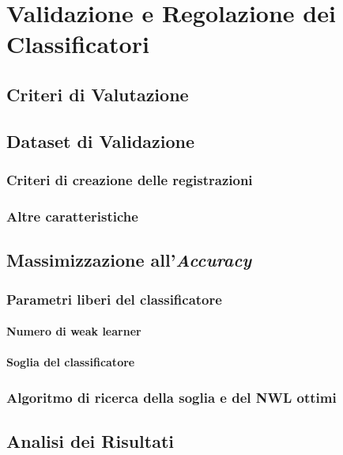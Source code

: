 
\chapter{Validazione e Regolazione dei Classificatori}
\label{chap:tuning}
    \section{Criteri di Valutazione}
    \label{sec:evaluation_criteria}
    \section{Dataset di Validazione}
    \label{sec:validation_dataset}
        \subsection{Criteri di creazione delle registrazioni}
        \subsection{Altre caratteristiche}
    \section{Massimizzazione all'\emph{Accuracy}}
    \label{sec:accuracy_maximization}
        \subsection{Parametri liberi del classificatore}
            \subsubsection{Numero di weak learner}
            \subsubsection{Soglia del classificatore}
        \subsection{Algoritmo di ricerca della soglia e del NWL ottimi}
    \section{Analisi dei Risultati}
    \label{sec:Analisi dei Risultati}
